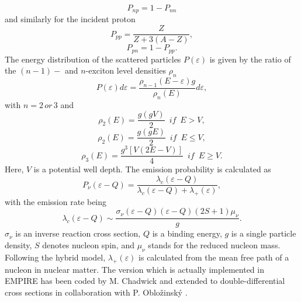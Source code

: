 \begin{equation}
P_{np}=1-P_{nn}  \label{Pnp}
\end{equation}
and similarly for the incident proton 
\begin{equation}
P_{pp}=\frac{Z}{Z+3(A-Z)},  \label{Ppp}
\end{equation}
\begin{equation}
P_{pn}=1-P_{pp}.  \label{Ppn}
\end{equation}
The energy distribution of the scattered particles $P(\varepsilon)$ is given
by the ratio of the $(n-1)-$ and $n$-exciton level densities%
 $\rho_{n}$ 
\begin{equation}
P(\varepsilon)d\varepsilon=%
\frac{\rho_{n-1}(E-\varepsilon)g}{\rho_{n}(E)}d\varepsilon,  \label{Penergy}
\end{equation}
with $n=2\, or\,3$ and%
\begin{equation}
\rho_{2}(E)=\frac{g(gV)}{2}\,\,\, if\,\,\, E>V,  \label{ro2u}
\end{equation}
\begin{equation}
\rho_{2}(E)=\frac{g(gE)}{2}\,\,\, if\,\,\, E\leq V,  \label{ro2d}
\end{equation}
\begin{equation}
\rho_{3}(E)=\frac{g^{3}\left[V(2E-V)\right]}{4}\,\,\, if\,\,\, E\geq V.
\label{ro3}
\end{equation}
Here, $V$ is a potential well depth. The emission probability is calculated
as 
\begin{equation}
P_{\nu}(\varepsilon-Q)=\frac{\lambda_{c}(\varepsilon-Q)}{\lambda_{c}(%
\varepsilon-Q)+\lambda_{+}(\varepsilon)},  \label{Pnu}
\end{equation}
with the emission rate being 
\begin{equation}
\lambda_{c}(\varepsilon-Q)\sim\frac{\sigma_{\nu}(\varepsilon-Q)(%
\varepsilon-Q)(2S+1)\mu_{\nu}}{g}.  \label{lambdac}
\end{equation}
$\sigma_{\nu}$ is an inverse reaction cross section, $Q$ is a binding
energy, $g$ is a single particle density, $S$ denotes nucleon spin, and $%
\mu_{\nu}$ stands for the reduced nucleon mass. Following the hybrid%
 model, $\lambda_{+}(\varepsilon)$ is calculated from the mean
free path of a nucleon in nuclear matter. The version which is actually
implemented in EMPIRE has been coded by M. Chadwick and extended to
double-differential cross sections in collaboration with P. Oblo\v zinsk\' y 
\cite{DDHMScode}.

